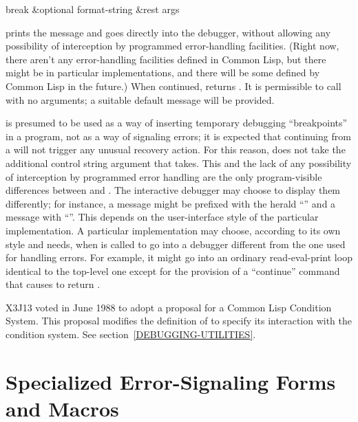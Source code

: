 \begin{defun}[Function]
break &optional format-string &rest args

\begin{obsolete}\noindent
{} prints the message and goes directly into the debugger,
without allowing 
any possibility of interception by programmed error-handling facilities.
(Right now, there aren't any error-handling facilities defined in Common Lisp,
but there might be in particular implementations, and there will be some
defined by Common Lisp in the future.)
When continued,  returns {\false}.  It is permissible to
call  with no arguments; a suitable default message will be provided.

 is presumed to be used as a way of inserting temporary debugging
``breakpoints'' in a program, not as a way of signaling errors;
it is expected that
continuing from a  will not trigger any unusual recovery action.
For this reason,  does not
take the additional  control string argument that 
takes.  This and the lack of any possibility of interception by programmed
error handling are the only program-visible differences between 
and .
The interactive debugger may choose to display them
differently; for instance, a  message might be prefixed with
the herald
``'' and a  message with
``''.  This depends on
the user-interface style of the particular implementation.  A particular
implementation may choose, according to its own style and needs,
when  is called to go
into a debugger different from the one used for handling errors.
For example, it might go into an ordinary read-eval-print loop identical to
the top-level one except for the provision of a ``continue'' command that
causes  to return {\false}.
\end{obsolete}

\begin{new}
X3J13 voted in June 1988
to adopt a proposal for a Common Lisp Condition System. 
This proposal modifies the definition of  to specify its interaction
with the condition system.  See section~\ref{DEBUGGING-UTILITIES}.
\end{new}
\end{defun}

\section{Specialized Error-Signaling Forms and Macros}
\label{SPECIALIZED-ERROR-SIGNALLING}

